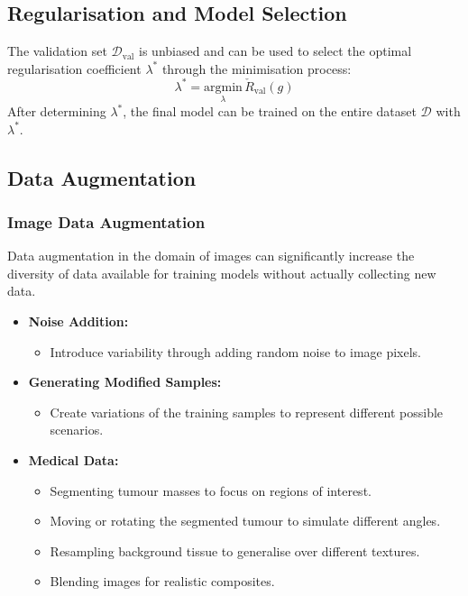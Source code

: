 \subsection*{Regularisation and Model Selection}
The validation set \( \mathcal{D}_{\text{val}} \) is unbiased and can be used to select the optimal regularisation coefficient \( \lambda^* \) through the minimisation process:
    \begin{equation}
        \lambda^* = \underset{\lambda}{\text{argmin}} \, \check{R}_{\text{val}}(g)
    \end{equation}
After determining \( \lambda^* \), the final model can be trained on the entire dataset \( \mathcal{D} \) with \( \lambda^* \).



\subsection{Data Augmentation}
\subsubsection{Image Data Augmentation}
Data augmentation in the domain of images can significantly increase the diversity of data available for training models without actually collecting new data.

\begin{itemize}
    \item \textbf{Noise Addition:}
    \begin{itemize}
        \item Introduce variability through adding random noise to image pixels.
    \end{itemize}
    
    \item \textbf{Generating Modified Samples:}
    \begin{itemize}
        \item Create variations of the training samples to represent different possible scenarios.
    \end{itemize}
    
    \item \textbf{Medical Data:}
    \begin{itemize}
        \item Segmenting tumour masses to focus on regions of interest.
        \item Moving or rotating the segmented tumour to simulate different angles.
        \item Resampling background tissue to generalise over different textures.
        \item Blending images for realistic composites.
    \end{itemize}
\end{itemize}

